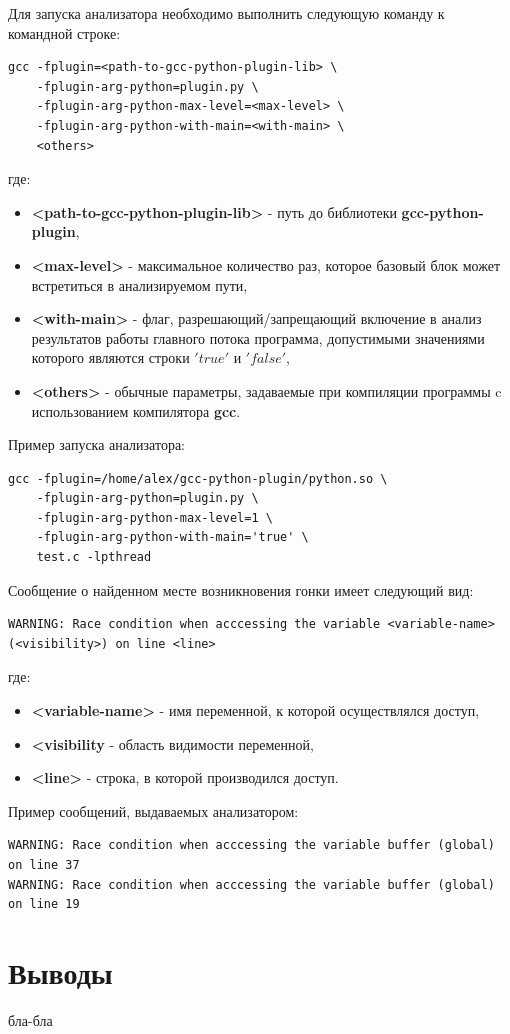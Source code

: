Для запуска анализатора необходимо выполнить следующую команду к командной строке:
\begin{verbatim}
gcc -fplugin=<path-to-gcc-python-plugin-lib> \
    -fplugin-arg-python=plugin.py \
    -fplugin-arg-python-max-level=<max-level> \
    -fplugin-arg-python-with-main=<with-main> \
    <others>
\end{verbatim}
где:
\begin{itemize}
  \item \textbf{<path-to-gcc-python-plugin-lib>} - путь до библиотеки \textbf{gcc-python-plugin},
  \item \textbf{<max-level>} - максимальное количество раз, которое базовый блок может встретиться в анализируемом пути,
  \item \textbf{<with-main>} - флаг, разрешающий/запрещающий включение в анализ результатов работы главного потока программа, допустимыми значениями которого являются строки $'true'$ и $'false'$,
  \item \textbf{<others>} - обычные параметры, задаваемые при компиляции программы c использованием компилятора \textbf{gcc}.
\end{itemize}

Пример запуска анализатора:
\begin{verbatim}
gcc -fplugin=/home/alex/gcc-python-plugin/python.so \
    -fplugin-arg-python=plugin.py \
    -fplugin-arg-python-max-level=1 \
    -fplugin-arg-python-with-main='true' \
    test.c -lpthread
\end{verbatim}

Сообщение о найденном месте возникновения гонки имеет следующий вид:
\begin{verbatim}
WARNING: Race condition when acccessing the variable <variable-name> (<visibility>) on line <line>
\end{verbatim}
где:
\begin{itemize}
  \item \textbf{<variable-name>} - имя переменной, к которой осуществлялся доступ,
  \item \textbf{<visibility} - область видимости переменной,
  \item \textbf{<line>} - строка, в которой производился доступ.
\end{itemize}

Пример сообщений, выдаваемых анализатором:
\begin{verbatim}
WARNING: Race condition when acccessing the variable buffer (global) on line 37
WARNING: Race condition when acccessing the variable buffer (global) on line 19
\end{verbatim}

\section{Выводы}

бла-бла
